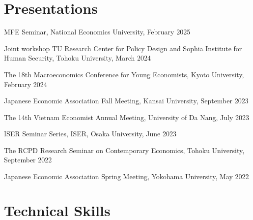 \documentclass[12pt]{article}
\begin{document}

\section{Presentations}

\begin{enumerate}[label={[\arabic*]}]
\item MFE Seminar, National Economics University, February 2025
\item Joint workshop TU Research Center for Policy Design and Sophia Institute for Human Security, Tohoku University, March 2024
\item The 18th Macroeconomics Conference for Young Economists, Kyoto University, February 2024
\item Japanese Economic Association Fall Meeting, Kansai University, September 2023
\item The 14th Vietnam Economist Annual Meeting, University of Da Nang, July 2023
\item ISER Seminar Series, ISER, Osaka University, June 2023
\item The RCPD Research Seminar on Contemporary Economics, Tohoku University, September 2022
\item Japanese Economic Association Spring Meeting, Yokohama University, May 2022
\end{enumerate}

%
%
%
%
%

\section{Technical Skills}
\end{document}
